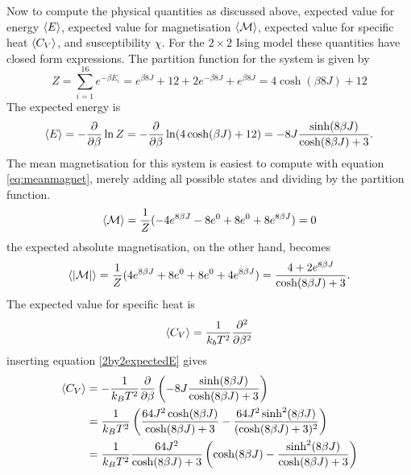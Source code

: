 \documentclass[10pt,a4paper]{amsart}
\begin{document}
Now to compute the physical quantities as discussed above, expected value for energy $\ev{E}$, expected value for magnetisation $\ev{\mathcal{M}}$, expected value for specific heat $\ev{C_V}$, and susceptibility $\chi$. For the $2\times2$ Ising model these quantities have closed form expressions. The partition function for the system is given by
\begin{equation}
\label{2by2partition}
Z = \sum_{i=1}^16 e^{-\beta E_i} = e^{\beta8J} + 12 + 2e^{-\beta8J} + e^{\beta8J} = 4\cosh(\beta8J) + 12
\end{equation}
The expected energy is
\begin{equation}
\label{2by2expectedE}
\ev{E} = -\frac{\partial}{\partial\beta} \ln Z = -\frac{\partial}{\partial \beta}\ln(4\cosh(\beta J) + 12)
 = -8J \frac{\sinh(8\beta J)}{\cosh(8\beta J) + 3}.
\end{equation}
The mean magnetisation for this system is easiest to compute with equation \ref{eq:meanmagnet}, merely adding all possible states and dividing by the partition function.
\begin{equation}
\label{eq:2by2meanmagnet}
\ev{\mathcal{M}}= \frac{1}{Z}(-4e^{8\beta J} - 8e^0 + 8e^0 +8e^{8\beta J}) = 0
\end{equation}
the expected absolute magnetisation, on the other hand, becomes
\begin{equation}
\label{eq:2by2absmeanmagnet}
\ev{\abs{\mathcal{M}}} = \frac{1}{Z}(4e^{8\beta J} + 8e^0 + 8e^0 + 4e^{8\beta J}) = \frac{4 +2 e^{8\beta J}}{\cosh(8\beta J) +3}.
\end{equation}
The expected value for specific heat is
\begin{equation}
\label{eq:2by2specificheat}
\ev{C_V} = \frac{1}{k_bT^2}\frac{\partial^2}{\partial\beta^2}
\end{equation}
inserting equation \ref{2by2expectedE} gives
\begin{align*}
\ev{C_V} 	&= -\frac{1}{k_BT^2}\frac{\partial}{\partial\beta}\left(-8J\frac{\sinh(8\beta J)}{\cosh(8\beta J)+3} \right) \\
			&= \frac{1}{k_BT^2}\left(\frac{64J^2\cosh(8\beta J)}{\cosh(8\beta J)+3}-\frac{64J^2\sinh^2(8\beta J)}{(\cosh(8\beta J)+3)^2}\right) \\
			&= \frac{1}{k_BT^2}\frac{64J^2}{\cosh(8\beta J) + 3}\left(\cosh(8\beta J) - \frac{\sinh^2(8\beta J)}{\cosh(8\beta J) +3} \right)
\end{align*}
\end{document}
